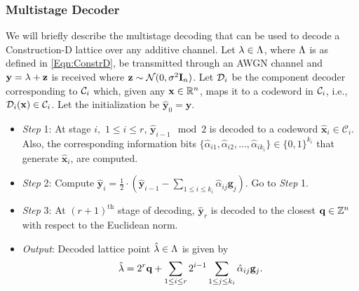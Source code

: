 \documentclass[journal,draftcls,onecolumn,12pt,twoside]{IEEEtran}
\begin{document}
\subsubsection*{Multistage Decoder}
We will briefly describe the multistage decoding that can be used to decode a Construction-D lattice over any additive channel. Let $\lambda\in\Lambda$, where $\Lambda$ is as defined in \eqref{Eqn:ConstrD}, be transmitted through an AWGN channel and $\mathbf{y}=\lambda+\mathbf{z}$ is received where $\mathbf{z}\sim\mathcal{N}(0,\sigma^{2} \mathbf{I}_{n})$. Let $\mathcal{D}_{i}$ be the component decoder corresponding to $\mathcal{C}_{i}$ which, given any $\mathbf{x}\in\mathbb{R}^{n}$, maps it to a codeword in $\mathcal{C}_{i}$, i.e., $\mathcal{D}_{i}(\mathbf{x})\in\mathcal{C}_{i}$. Let the initialization be $\hat{\mathbf{y}}_{0}=\mathbf{y}$.
\begin{itemize}
\item \textit{Step} 1: At stage $i, $ $1\leq i\leq r$, $\hat{\mathbf{y}}_{i-1}\mod 2$ is decoded to a codeword  $\hat{\mathbf{x}}_{i}\in \mathcal{C}_{i}$. Also, the corresponding information bits  $\{\hat{\alpha}_{i1},\hat{\alpha}_{i2},\ldots, \hat{\alpha}_{ik_{i}}\}\in \{0,1\}^{k_{i}}$ that generate $\hat{\mathbf{x}}_{i}$, are computed.
\item \textit{Step} 2: Compute $\hat{\mathbf{y}}_{i}= \frac{1}{2} \cdot(\hat{\mathbf{y}}_{i-1}-\sum_{1\leq i\leq k_{i}}\hat{\alpha}_{ij}\mathbf{g}_j)$. Go to \textit{Step} 1.
\item \textit{Step} 3: At $(r+1)^{\text{th}}$ stage of decoding, $\hat{\mathbf{y}}_{r}$ is decoded to the closest $\mathbf{q}\in\mathbb{Z}^{n}$ with respect to the Euclidean norm.
\item \textit{Output}: Decoded lattice point $\hat{\mathbf{\lambda}}\in\Lambda$ is given by
\begin{align}
    \hat{\mathbf{\lambda}}=2^{r}\mathbf{q}+\sum_{1\leq i\leq r}2^{i-1}\sum_{1\leq j\leq k_{i}}\hat{\alpha}_{ij}\mathbf{g}_{j}.
\end{align}

\end{itemize}
\end{document}
